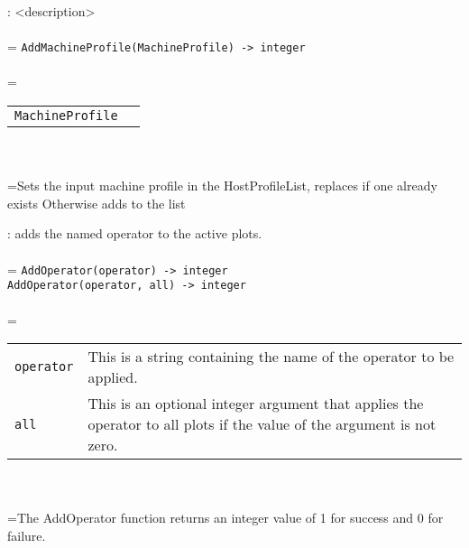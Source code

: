 \documentclass[10pt,a4paper]{report}
\begin{document}
{}
: <description>\\[-3mm]

 \\ 
\hangindent=\parindent 
\verb!AddMachineProfile(MachineProfile) -> integer!\\ [-3mm]

 \\ 
\hangindent=\parindent 
\begin{tabular}{ll}
\verb!MachineProfile! &  \\
\end{tabular} \\[-2mm]


 \\ 
\hangindent=\parindent Sets the input machine profile in the HostProfileList, replaces if one already exists Otherwise adds to the list \\[-3mm] 

\newpage


{}
: adds the named operator to the active plots.\\[-3mm]

 \\ 
\hangindent=\parindent 
\verb!AddOperator(operator) -> integer!\\ 
\verb!AddOperator(operator, all) -> integer!\\ [-3mm]

 \\ 
\hangindent=\parindent 
\begin{tabular}{lp{9cm}}
\verb!operator! & This is a string containing the name of the operator to be applied. \\
\verb!all! & This is an optional integer argument that applies the operator to all plots if the value of the argument is not zero. \\
\end{tabular} \\[-2mm]


 \\ 
\hangindent=\parindent The AddOperator function returns an integer value of 1 for success and 0 for failure. \\[-3mm] 
\end{document}
